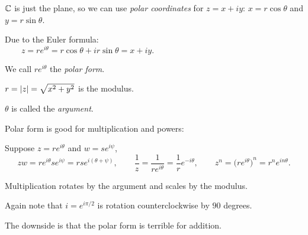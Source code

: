 \documentclass[10pt,aspectratio=169]{beamer}
\begin{document}
\begin{frame}
${\mathbb{C}}$ is just the plane, so we can use \emph{polar coordinates} for $z=x+iy$:
$x = r \cos \theta$ and $y= r \sin \theta$.

\medskip
\pause
Due to the Euler formula:
\begin{equation*}
z = r e^{i\theta} = r\cos \theta + i r\sin \theta  = x+iy .
\qquad \qquad \qquad \qquad \qquad \qquad \qquad \qquad
\end{equation*}

\vspace*{-0.5in}
\hspace*{3.5in}{polarcoords.pdf_t}

\vspace*{-0.4in}

\pause

We call $re^{i \theta}$ the \emph{polar form}.

\pause
\medskip


$r = \lvert {z} \rvert = \sqrt{x^2+y^2}$ is the modulus.

\pause
\medskip

$\theta$ is called the \emph{argument}.

\end{frame}

\begin{frame}

Polar form is good for multiplication and powers:

\pause
\medskip

Suppose $z = r e^{i\theta}$ and $w = s e^{i \psi}$,
\pause
\begin{equation*}
zw =
r e^{i \theta} s e^{i \psi} = 
rs e^{i (\theta+ \psi)},
\qquad
\frac{1}{z} =
\frac{1}{r e^{i \theta}} =
\frac{1}{r} e^{-i \theta} ,
\qquad
z^n =
{\bigl(r e^{i \theta}\bigr)}^n =
r^n e^{i n\theta} .
\end{equation*}

\medskip
\pause

Multiplication rotates by the argument and scales by the modulus.

\pause
\medskip

Again note that $i = e^{i \pi / 2}$ is
rotation counterclockwise by $90$ degrees.

\pause
\medskip

The downside is that the polar form is terrible for addition.

\end{frame}
\end{document}
